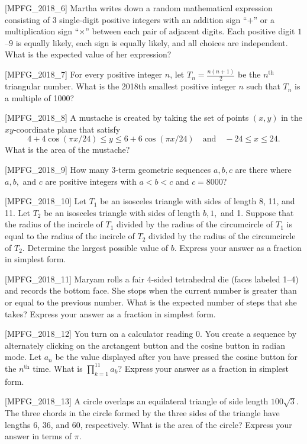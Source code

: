 [MPFG_2018_6]
Martha writes down a random mathematical expression consisting of 3 single-digit positive integers with an addition sign ``$+$'' or a multiplication sign ``$\times$'' between each pair of adjacent digits. Each positive digit $1$–$9$ is equally likely, each sign is equally likely, and all choices are independent. What is the expected value of her expression?

[MPFG_2018_7]
For every positive integer $n$, let $T_n = \frac{n(n+1)}{2}$ be the $n^{\text{th}}$ triangular number. What is the 2018th smallest positive integer $n$ such that $T_n$ is a multiple of 1000?

[MPFG_2018_8]
A mustache is created by taking the set of points $(x, y)$ in the $xy$-coordinate plane that satisfy
$$4 + 4\cos(\pi x/24) \le y \le 6 + 6\cos(\pi x/24) \quad \text{and} \quad -24 \le x \le 24.$$
What is the area of the mustache?

[MPFG_2018_9]
How many 3-term geometric sequences $a, b, c$ are there where $a, b,$ and $c$ are positive integers with $a < b < c$ and $c = 8000$?

[MPFG_2018_10]
Let $T_1$ be an isosceles triangle with sides of length 8, 11, and 11. Let $T_2$ be an isosceles triangle with sides of length $b, 1,$ and 1. Suppose that the radius of the incircle of $T_1$ divided by the radius of the circumcircle of $T_1$ is equal to the radius of the incircle of $T_2$ divided by the radius of the circumcircle of $T_2$. Determine the largest possible value of $b$. Express your answer as a fraction in simplest form.

[MPFG_2018_11]
Maryam rolls a fair 4-sided tetrahedral die (faces labeled 1–4) and records the bottom face. She stops when the current number is greater than or equal to the previous number. What is the expected number of steps that she takes? Express your answer as a fraction in simplest form.

[MPFG_2018_12]
You turn on a calculator reading $0$. You create a sequence by alternately clicking on the arctangent button and the cosine button in radian mode. Let $a_n$ be the value displayed after you have pressed the cosine button for the $n^{\text{th}}$ time. What is $\prod_{k=1}^{11} a_k$? Express your answer as a fraction in simplest form.

[MPFG_2018_13]
A circle overlaps an equilateral triangle of side length $100\sqrt{3}$. The three chords in the circle formed by the three sides of the triangle have lengths 6, 36, and 60, respectively. What is the area of the circle? Express your answer in terms of $\pi$.


